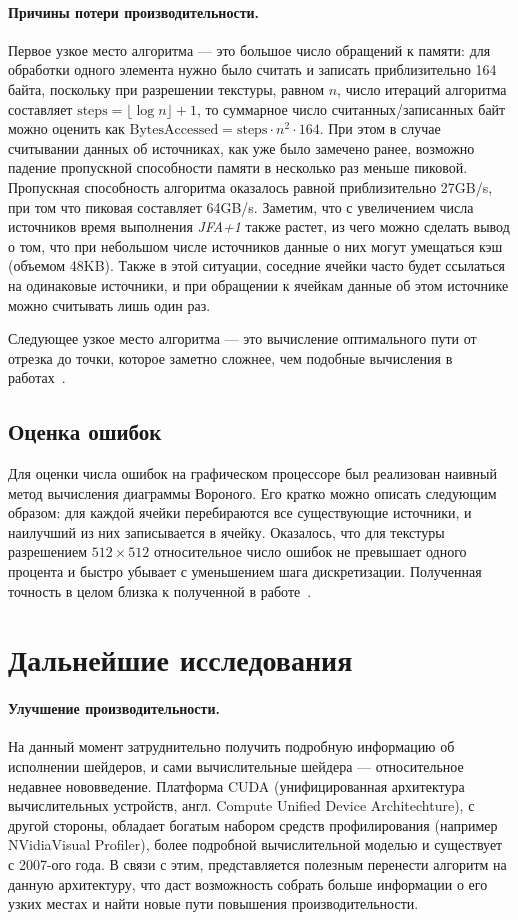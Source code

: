 \documentclass[12pt]{article}
\begin{document}
\paragraph{Причины потери производительности.} Первое узкое место алгоритма --- это большое число обращений к памяти:
для обработки одного элемента нужно было считать и записать приблизительно 164 байта,
поскольку при разрешении текстуры, равном $n$, число итераций алгоритма составляет
$\mathrm{steps} = \lfloor \log n \rfloor + 1$, то суммарное число считанных/записанных байт 
можно  оценить как $\mathrm{BytesAccessed} = \mathrm{steps} \cdot n^2 \cdot 164$. При этом 
в случае считывании данных об источниках, как уже было замечено ранее, возможно
падение пропускной способности памяти в несколько раз меньше пиковой. Пропускная
способность алгоритма оказалось равной приблизительно 27GB/s, при том что пиковая 
составляет 64GB/s. Заметим, что с увеличением числа источников время выполнения 
\emph{JFA+1} также растет, из чего можно сделать вывод о том, что при небольшом 
числе источников данные о них могут умещаться кэш (объемом 48KB).
Также в этой ситуации, соседние ячейки часто будет ссылаться на одинаковые 
источники, и при обращении к ячейкам данные об этом источнике можно считывать
лишь один раз.

Следующее узкое место алгоритма --- это вычисление оптимального пути от отрезка
до точки, которое заметно сложнее, чем подобные вычисления в работах~\cite{jfa, gvd}.

\subsection{Оценка ошибок}
Для оценки числа ошибок на графическом процессоре был реализован наивный метод
вычисления диаграммы Вороного. Его кратко можно описать следующим образом:
для каждой ячейки перебираются все существующие источники, и наилучший из них записывается 
в ячейку. Оказалось, что для текстуры разрешением $512 \times 512$ относительное 
число ошибок не превышает одного процента и быстро убывает с 
уменьшением шага дискретизации. Полученная точность в целом близка к полученной
в работе~\cite{gvd}.

\section{Дальнейшие исследования}
\label{future}
\paragraph{Улучшение производительности.} На данный момент затруднительно получить
подробную информацию об исполнении шейдеров, и сами вычислительные шейдера ---
относительное недавнее нововведение. Платформа CUDA (унифицированная 
архитектура вычислительных устройств, англ. Compute Unified Device Architechture), 
с другой стороны, обладает богатым набором средств профилирования 
(например NVidia\textregistered Visual Profiler), 
более подробной вычислительной моделью и существует с 2007-ого года. В связи с этим, 
представляется полезным перенести алгоритм на данную архитектуру,
что даст возможность собрать больше информации о его узких местах 
и найти новые пути повышения производительности.
\end{document}
